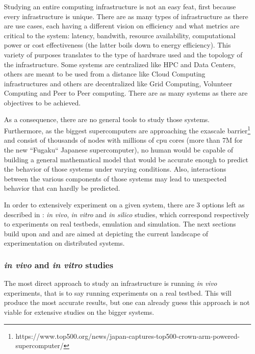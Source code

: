 \documentclass[12pt, a4paper]{memoir}
\begin{document}
Studying an entire computing infrastructure is not an easy feat, first because
every infrastructure is unique. There are as many types of infrastructure as
there are use cases, each having a different vision on efficiency and what
metrics are critical to the system: latency, bandwith, resource availability,
computational power or cost effectiveness (the latter boils down to energy
efficiency). This variety of purposes translates to the type of hardware used
and the topology of the infrastructure. Some systems are centralized like HPC
and Data Centers, others are meant to be used from a distance like Cloud
Computing infrastructures and others are decentralized like Grid Computing,
Volunteer Computing and Peer to Peer computing. There are as many systems as
there are objectives to be achieved.

As a consequence, there are no general tools to study those systems.
Furthermore, as the biggest supercomputers are approaching the exascale
barrier\footnote{https://www.top500.org/news/japan-captures-top500-crown-arm-powered-supercomputer/}
and consist of thousands of nodes with millions of cpu cores (more than 7M for
the new ``Fugaku`` Japanese supercomputer), no human would be capable of
building a general mathematical model that would be accurate enough to predict
the behavior of those systems under varying conditions. Also, interactions
between the various components of those systems may lead to unexpected
behavior\cite{10.1007/978-3-319-09873-9_12} that can hardly be predicted.

In order to extensively experiment on a given system, there are 3 options left
as described in \cite{legrand2015scheduling}: \textit{in vivo}, \textit{in
vitro} and \textit{in silico} studies, which correspond respectively to
experiments on real testbeds, emulation and simulation.  The next sections
build upon \cite{legrand2015scheduling} and \cite{casanova:hal-01017319} and
are aimed at depicting the current landscape of experimentation on distributed
systems.

\subsubsection{\textit{in vivo} and \textit{in vitro} studies}

The most direct approach to study an infrastructure is running \textit{in vivo}
experiments, that is to say running experiments on a real testbed. This will
produce the most accurate results, but one can already guess this approach is
not viable for extensive studies on the bigger systems.
\end{document}
